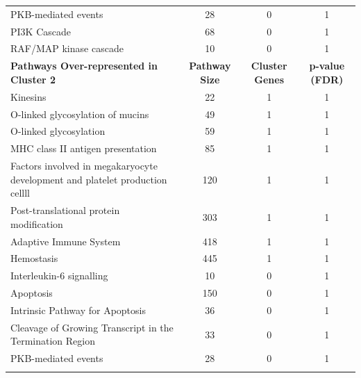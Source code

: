 \begin{table}[!hp]
{\begin{threeparttable}
\begin{tabular}{lccc}
  \rowcolor{Cluster_Blue!15}
  PKB-mediated events &  28 &   0 &   1 \\ 
  \rowcolor{Cluster_Blue!20}
  PI3K Cascade &  68 &   0 &   1 \\ 
  \rowcolor{Cluster_Blue!15}
  RAF/MAP kinase cascade &  10 &   0 &   1 \\ 
  \hline
  \cellcolor{white} \large{\textbf{Pathways Over-represented in Cluster 2}} & \large{\textbf{Pathway Size}} & \large{\textbf{Cluster Genes}} & \large{\textbf{p-value (\gls{FDR})}} \\ %
  \hline
  \rowcolor{Cluster_Green!30}
  Kinesins &  22 &   1 &   1 \\ 
  \rowcolor{Cluster_Green!20}
  O-linked glycosylation of mucins &  49 &   1 &   1 \\ 
  \rowcolor{Cluster_Green!30}
  O-linked glycosylation &  59 &   1 &   1 \\ 
  \rowcolor{Cluster_Green!20}
  MHC class II antigen presentation &  85 &   1 &   1 \\ 
  \rowcolor{Cluster_Green!30}
  Factors involved in megakaryocyte development and platelet production \textcolor{Cluster_Green!30} {cellll} & 120 &   1 &   1 \\
  \rowcolor{Cluster_Green!20}
  Post-translational protein modification & 303 &   1 &   1 \\ 
  \rowcolor{Cluster_Green!30}
  Adaptive Immune System & 418 &   1 &   1 \\ 
  \rowcolor{Cluster_Green!20}
  Hemostasis & 445 &   1 &   1 \\ 
  \rowcolor{Cluster_Green!30}
  Interleukin-6 signalling &  10 &   0 &   1 \\ 
  \rowcolor{Cluster_Green!20}
  Apoptosis & 150 &   0 &   1 \\ 
  \rowcolor{Cluster_Green!30}
  Intrinsic Pathway for Apoptosis &  36 &   0 &   1 \\ 
  \rowcolor{Cluster_Green!20}
  Cleavage of Growing Transcript in the Termination Region &  33 &   0 &   1 \\ 
  \rowcolor{Cluster_Green!30}
  PKB-mediated events &  28 &   0 &   1 \\ 
  \rowcolor{Cluster_Green!20}

\end{tabular}
\end{threeparttable}}
\end{table}
